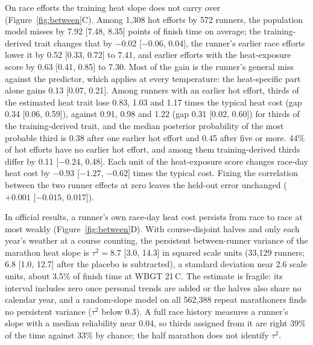 \documentclass[11pt]{article}
\renewcommand{\_}{\textunderscore\allowbreak}
\begin{document}
On race efforts the training heat slope does not carry over (Figure~\ref{fig:between}C). Among 1{,}308 hot efforts by 572 runners, the population model misses by 7.92 [7.48, 8.35] points of finish time on average; the training-derived trait changes that by $-0.02$ [$-0.06$, 0.04], the runner's earlier race efforts lower it by 0.52 [0.33, 0.72] to 7.41, and earlier efforts with the heat-exposure score by 0.63 [0.41, 0.85] to 7.30. Most of the gain is the runner's general miss against the predictor, which applies at every temperature: the heat-specific part alone gains 0.13 [0.07, 0.21]. Among runners with an earlier hot effort, thirds of the estimated heat trait lose 0.83, 1.03 and 1.17 times the typical heat cost (gap 0.34 [0.06, 0.59]), against 0.91, 0.98 and 1.22 (gap 0.31 [0.02, 0.60]) for thirds of the training-derived trait, and the median posterior probability of the most probable third is 0.38 after one earlier hot effort and 0.45 after five or more. 44\% of hot efforts have no earlier hot effort, and among them training-derived thirds differ by 0.11 [$-0.24$, 0.48]. Each unit of the heat-exposure score changes race-day heat cost by $-0.93$ [$-1.27$, $-0.62$] times the typical cost. Fixing the correlation between the two runner effects at zero leaves the held-out error unchanged ($+0.001$ [$-0.015$, 0.017]).

In official results, a runner's own race-day heat cost persists from race to race at most weakly (Figure~\ref{fig:between}D). With course-disjoint halves and only each year's weather at a course counting, the persistent between-runner variance of the marathon heat slope is $\tau^2 = 8.7$ [3.0, 14.3] in squared scale units (33{,}129 runners; 6.8 [1.0, 12.7] after the placebo is subtracted), a standard deviation near 2.6 scale units, about 3.5\% of finish time at WBGT 21\,\textdegree C. The estimate is fragile: its interval includes zero once personal trends are added or the halves also share no calendar year, and a random-slope model on all 562{,}388 repeat marathoners finds no persistent variance ($\tau^2$ below 0.3). A full race history measures a runner's slope with a median reliability near 0.04, so thirds assigned from it are right 39\% of the time against 33\% by chance; the half marathon does not identify $\tau^2$.
\end{document}

